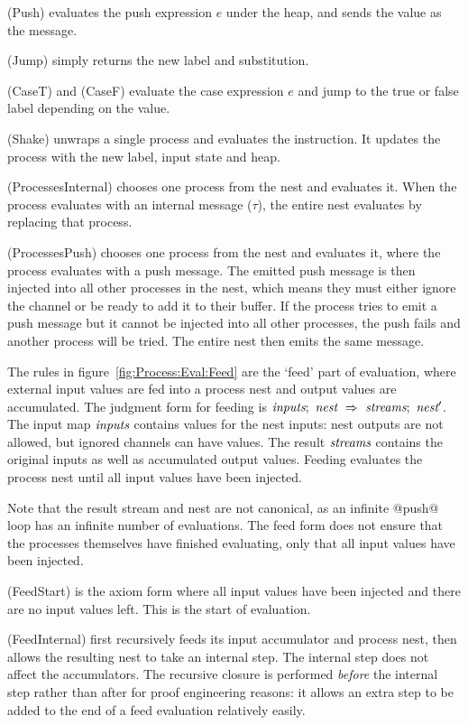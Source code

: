 (Push) evaluates the push expression $e$ under the heap, and sends the value as the message.

(Jump) simply returns the new label and substitution.

(CaseT) and (CaseF) evaluate the case expression $e$ and jump to the true or false label depending on the value.

(Shake) unwraps a single process and evaluates the instruction.
It updates the process with the new label, input state and heap.

(ProcessesInternal) chooses one process from the nest and evaluates it.
When the process evaluates with an internal message ($\tau$), the entire nest evaluates by replacing that process.

(ProcessesPush) chooses one process from the nest and evaluates it, where the process evaluates with a push message.
The emitted push message is then injected into all other processes in the nest, which means they must either ignore the channel or be ready to add it to their buffer.
If the process tries to emit a push message but it cannot be injected into all other processes, the push fails and another process will be tried.
The entire nest then emits the same message.

The rules in figure~\ref{fig:Process:Eval:Feed} are the `feed' part of evaluation, where external input values are fed into a process nest and output values are accumulated.
The judgment form for feeding is $\textit{inputs};~\textit{nest}~\Rightarrow~\textit{streams};~\textit{nest}'$.
The input map $\textit{inputs}$ contains values for the nest inputs: nest outputs are not allowed, but ignored channels can have values.
The result $\textit{streams}$ contains the original inputs as well as accumulated output values.
Feeding evaluates the process nest until all input values have been injected.

Note that the result stream and nest are not canonical, as an infinite @push@ loop has an infinite number of evaluations.
The feed form does not ensure that the processes themselves have finished evaluating, only that all input values have been injected.

(FeedStart) is the axiom form where all input values have been injected and there are no input values left.
This is the start of evaluation.

(FeedInternal) first recursively feeds its input accumulator and process nest, then allows the resulting nest to take an internal step.
The internal step does not affect the accumulators.
The recursive closure is performed \emph{before} the internal step rather than after for proof engineering reasons: it allows an extra step to be added to the end of a feed evaluation relatively easily.

